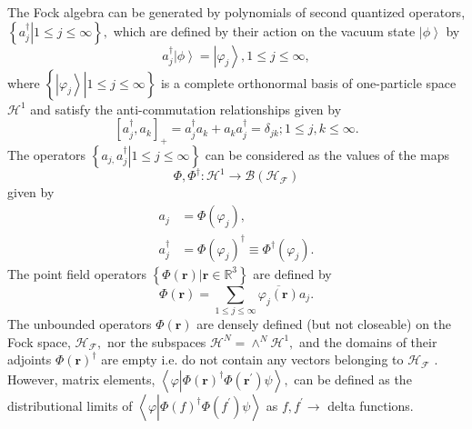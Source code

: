 \documentclass[aps,preprint]{revtex4}%
\begin{document}
The Fock algebra can be generated by polynomials of second quantized
operators, $\left\{  \left.  a_{j}^{\dagger}\right\vert 1\leq j\leq
\infty\right\}  ,$ which are defined by their action on the vacuum state
$\left\vert \phi\right\rangle $ by
\begin{equation}
a_{j}^{\dagger}\left\vert \phi\right\rangle =\left\vert \varphi_{j}%
\right\rangle ,1\leq j\leq\infty,
\end{equation}
where $\left\{  \left.  \left\vert \varphi_{j}\right\rangle \right\vert 1\leq
j\leq\infty\right\}  $ is a complete orthonormal basis of one-particle space
$\mathcal{H}^{1}$ and satisfy the anti-commutation relationships given by
\begin{equation}
\left[  a_{j}^{\dagger},a_{k}\right]  _{+}=a_{j}^{\dagger}a_{k}+a_{k}%
a_{j}^{\dagger}=\delta_{jk};1\leq j,k\leq\infty.
\end{equation}
The operators $\left\{  \left.  a_{j,}a_{j}^{\dagger}\right\vert 1\leq
j\leq\infty\right\}  $ can be considered as the values of the maps
\begin{equation}
\Phi,\Phi^{\dagger}:\mathcal{H}^{1}\rightarrow\mathcal{B}\left(
\mathcal{H}_{\mathcal{F}}\right)
\end{equation}
given by
\begin{align}
a_{j}  &  =\Phi\left(  \varphi_{j}\right)  ,\nonumber\\
a_{j}^{\dagger}  &  =\Phi\left(  \varphi_{j}\right)  ^{\dagger}\equiv
\Phi^{\dagger}\left(  \varphi_{j}\right)  .
\end{align}
The point field operators $\left\{  \left.  \Phi\left(  \boldsymbol{r}\right)
\right\vert \boldsymbol{r\in}\mathbb{R}^{3}\right\}  $ are defined by
\cite{Thirring}
\begin{equation}
\Phi\left(  \boldsymbol{r}\right)  =\sum_{1\leq j\leq\infty}\overline
{\varphi_{j}\left(  \boldsymbol{r}\right)  }a_{j}.
\end{equation}
The unbounded operators $\Phi\left(  \boldsymbol{r}\right)  $ are densely
defined (but not closeable) on the Fock space, $\mathcal{H}_{\mathcal{F}},$
nor the subspaces $\mathcal{H}^{N}=\wedge^{N}\mathcal{H}^{1},$ and the domains
of their adjoints $\Phi\left(  \boldsymbol{r}\right)  ^{\dagger}$ are empty
i.e. do not contain any vectors belonging to $\mathcal{H}_{\mathcal{F}}$
\cite{Thirring}. However, matrix elements, $\left\langle \varphi\left\vert
\Phi\left(  \boldsymbol{r}\right)  ^{\dagger}\Phi\left(  \boldsymbol{r}%
^{\prime}\right)  \right.  \psi\right\rangle ,$ can be defined as the
distributional limits of $\left\langle \varphi\left\vert \Phi\left(  f\right)
^{\dagger}\Phi\left(  f^{\prime}\right)  \right.  \psi\right\rangle $ as
$f,f^{\prime}\rightarrow$ delta functions.
\end{document}
